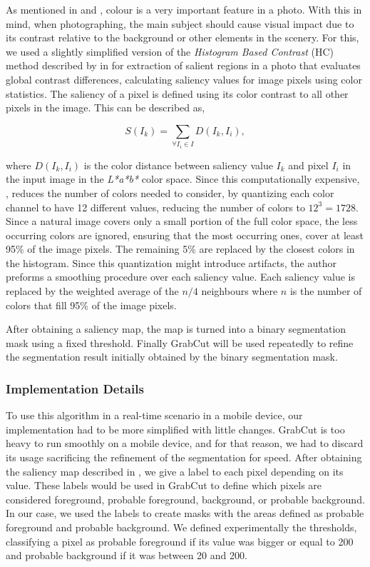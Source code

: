 As mentioned in \cite{Santos} and \cite{kamps2012rules}, colour is a very important feature in a photo. With this in mind, when photographing, the main subject should cause visual impact due to its contrast relative to the background or other elements in the scenery. For this, we used a slightly simplified version of the \emph{Histogram Based Contrast} (HC) method described by \citeauthor{cheng2011global} in \cite{cheng2011global} for extraction of salient regions in a photo that evaluates global contrast differences, calculating saliency values for image pixels using color statistics. The saliency of a pixel is defined using its color contrast to all other pixels in the image. This can be described as,

\begin{equation}
S(I_{k}) = \sum_{\forall I_{i} \in I} D(I_{k}, I_{i}),
\end{equation}

where $D(I_{k}, I_{i})$ is the color distance between saliency value $I_{k}$ and pixel $I_{i}$ in the input image in the \emph{L*a*b*} color space. Since this computationally expensive, \citeauthor{cheng2011global}, reduces the number of colors needed to consider, by quantizing each color channel to have 12 different values, reducing the number of colors to $12^{3} = 1728$. Since a natural image covers only a small portion of the full color space, the less occurring colors are ignored, ensuring that the most occurring ones, cover at least 95\% of the image pixels. The remaining 5\% are replaced by the closest colors in the histogram. Since this quantization might introduce artifacts, the author preforms a smoothing procedure over each saliency value. Each saliency value is replaced by the weighted average of the $n/4$ neighbours where $n$ is the number of colors that fill 95\% of the image pixels.

After obtaining a saliency map, the map is turned into a binary segmentation mask using a fixed threshold. Finally GrabCut\cite{rother2004grabcut} will be used repeatedly to refine the segmentation result initially obtained by the binary segmentation mask.

\subsubsection{Implementation Details}

To use this algorithm in a real-time scenario in a mobile device, our implementation had to be more simplified with little changes. GrabCut is too heavy to run smoothly on a mobile device, and for that reason, we had to discard its usage sacrificing the refinement of the segmentation for speed. After obtaining the saliency map described in \cite{cheng2011global}, we give a label to each pixel depending on its value. These labels would be used in GrabCut to define which pixels are considered foreground, probable foreground, background, or probable background. In our case, we used the labels to create masks with the areas defined as probable foreground and probable background.
We defined experimentally the thresholds, classifying a pixel as probable foreground if its value was bigger or equal to 200 and probable background if it was between 20 and 200.

